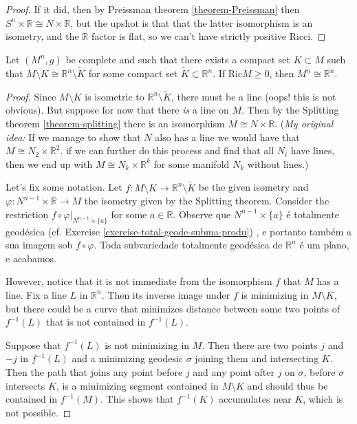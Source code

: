 \documentclass{book}
\begin{document}
\begin{proof}
If it did, then by Preissman theorem
\ref{theorem-Preissman} then $S^n\times
\mathbb{R}\cong N \times \mathbb{R}$, but the
upshot is that that the latter
isomorphism is an isometry, and the
$\mathbb{R}$ factor is flat, so we can't
have strictly positive Ricci.
\end{proof}

\begin{exercise}
\label{exercise-compl-witho-compa-set-isom}
Let $(M^n,g)$ be complete and such that there
exists a compact set
 $K\subset M$ such that $M\setminus K \cong
 \mathbb{R}^n \setminus \tilde{K}$
for some compact set $\tilde{K} \subset
\mathbb{R}^n$. If $\text{Ric}M \geq 0$,
then $M^n \cong \mathbb{R}^n$.
\end{exercise}

\begin{proof}
Since $M\setminus K$ is isometric to
$\mathbb{R}^n\setminus \tilde{K}$, there
must be a line (oops! this is not obvious).
But suppose for now that there {\it
is} a line on $M$. Then by the Splitting
theorem \ref{theorem-splitting} there
is an isomorphism $M \cong N \times
\mathbb{R}$. ({\it My original idea:}
 If we manage to show that $N$ also has a
 line we would have that
 $M \cong N_2 \times \mathbb{R}^2$.  if we
 can further do this process and find
 that all $N_i$ have lines,
then we end up with $M \cong N_k \times
\mathbb{R}^k$ for some manifold $N_k$
without lines.)

Let's fix some notation. Let
$f:M\setminus K \to \mathbb{R}^n
\setminus\tilde{K}$ be the given isometry and
$\varphi:N^{n-1}\times\mathbb{R} \to M$ the
isometry given by the Splitting
theorem. Consider the restriction $f \circ
\varphi |_{ N^{n-1}\times \{ a\}}$
for some $a \in \mathbb{R}$. Observe que
$N^{n-1}\times \{ a\}$ é totalmente
geodésica (cf. Exercise
\ref{exercise-total-geode-subma-produ})
, e portanto também a sua imagem sob  $f
\circ \varphi$. Toda subvariedade
totalmente geodésica de $\mathbb{R}^n$ é um
plano, e acabamos.

However, notice that it is not immediate from
the
isomorphism $f$ that $M$ has a line. Fix a
line $L$ in $\mathbb{R}^n$. Then its
inverse image under $f$ is minimizing in $M
\setminus K$, but there could be a
curve that minimizes distance between some
two points of $f^{-1}(L)$ that is not
contained in $f^{-1}(L)$.

Suppose that $f^{-1}(L)$ is not minimizing in
$M$. Then there are two points $j$
and $-j$ in $f^{-1}(L)$ and a minimizing
geodesic $\sigma$ joining them and
intersecting $K$. Then the path that joins
any point before $j$ and any point
after $j$ on $\sigma$, before $\sigma$
intersects $K$, is a minimizing segment
contained in $M\setminus K$ and should thus
be contained in $f^{-1}(M)$. This
shows that $f^{-1}(K)$ accumulates near $K$,
which is not possible.
\end{proof}
\end{document}
